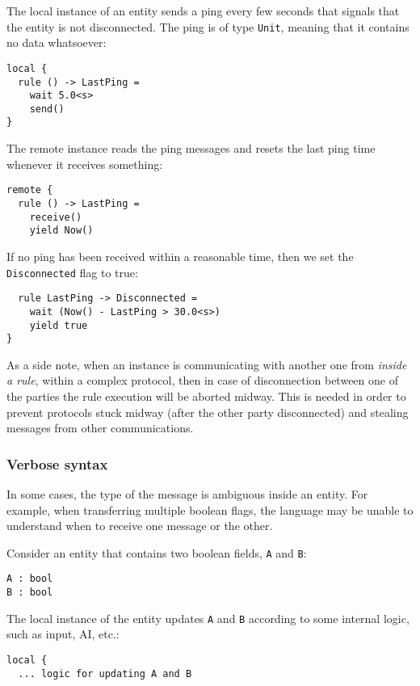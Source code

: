 The local instance of an entity sends a ping every few seconds that signals that the entity is not disconnected. The ping is of type \texttt{Unit}, meaning that it contains no data whatsoever:

\begin{lstlisting}
local {
  rule () -> LastPing =
    wait 5.0<s>
    send()
}
\end{lstlisting}

The remote instance reads the ping messages and resets the last ping time whenever it receives something:

\begin{lstlisting}
remote {
  rule () -> LastPing =
    receive()
    yield Now()
\end{lstlisting}

If no ping has been received within a reasonable time, then we set the \texttt{Disconnected} flag to true:

\begin{lstlisting}
  rule LastPing -> Disconnected =
    wait (Now() - LastPing > 30.0<s>)
    yield true
}
\end{lstlisting}

As a side note, when an instance is communicating with another one from \textit{inside a rule}, within a complex protocol, then in case of disconnection between one of the parties the rule execution will be aborted midway. This is needed in order to prevent protocols stuck midway (after the other party disconnected) and stealing messages from other communications.

\subsubsection{Verbose syntax}
In some cases, the type of the message is ambiguous inside an entity. For example, when transferring multiple boolean flags, the language may be unable to understand when to receive one message or the other.

Consider an entity that contains two boolean fields, \texttt{A} and \texttt{B}:

\begin{lstlisting}
A : bool
B : bool
\end{lstlisting}

The local instance of the entity updates \texttt{A} and \texttt{B} according to some internal logic, such as input, AI, etc.:

\begin{lstlisting}
local {
  ... logic for updating A and B
\end{lstlisting}

